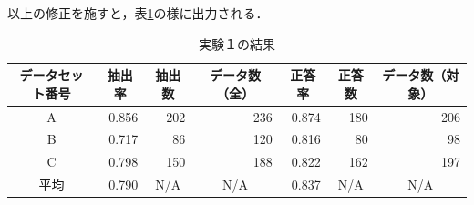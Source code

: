 以上の修正を施すと，表\ref{table:resultEx1e}の様に出力される．

\begin{table}[H]
\caption{実験１の結果}
\centering
\begin{tabular}{|c||r|r|r||r|r|r|}
\hline
\multicolumn{1}{|c||}{データセット番号} & \multicolumn{1}{c|}{抽出率}
  & \multicolumn{1}{c|}{抽出数} & \multicolumn{1}{c||}{データ数（全）}
  & \multicolumn{1}{c|}{正答率} & \multicolumn{1}{c|}{正答数}
  & \multicolumn{1}{c|}{データ数（対象）} \\ \hline \hline
A & 0.856 & 202 & 236 & 0.874 & 180 & 206\\ \hline
B & 0.717 & 86 & 120 & 0.816 & 80 & 98\\ \hline
C & 0.798 & 150 & 188 & 0.822 & 162 & 197\\ \hline
平均 & 0.790
  & \multicolumn{1}{c|}{N/A} & \multicolumn{1}{c||}{N/A}
  & 0.837 & \multicolumn{1}{c|}{N/A}
  & \multicolumn{1}{c|}{N/A} \\ \hline
\end{tabular}
\label{table:resultEx1e}
\end{table}
